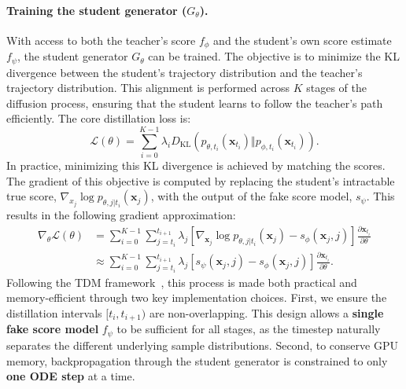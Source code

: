 \documentclass[letterpaper]{article} %
\begin{document}
\paragraph{Training the student generator ($G_{\theta}$).}
With access to both the teacher's score $f_{\phi}$ and the student's own score estimate $f_{\psi}$, the student generator $G_{\theta}$ can be trained. The objective is to minimize the KL divergence between the student's trajectory distribution and the teacher's trajectory distribution. This alignment is performed across $K$ stages of the diffusion process, ensuring that the student learns to follow the teacher's path efficiently. The core distillation loss is:
\begin{equation}
\label{eq:distillation_loss}
\mathcal{L}(\theta) = \sum_{i=0}^{K-1} \lambda_i D_{\text{KL}}\left( p_{\theta, t_i}(\mathbf{x}_{t_i}) \Vert p_{\phi, t_i}(\mathbf{x}_{t_i}) \right).
\end{equation}
In practice, minimizing this KL divergence is achieved by matching the scores. The gradient of this objective is computed by replacing the student's intractable true score, $\nabla_{x_j} \log p_{\theta, j|t_i}(\mathbf{x}_{j})$, with the output of the fake score model, $s_{\psi}$. This results in the following gradient approximation:
\begin{align}
\label{eq:distillation_gradient}
\nabla_{\theta} \mathcal{L}(\theta) &= \sum_{i=0}^{K-1} \sum_{j=t_i}^{t_{i+1}} \lambda_{j} [\nabla_{\mathbf{x}_j} \log p_{\theta, j|t_i}(\mathbf{x}_{j}) - s_{\phi}(\mathbf{x}_{j}, j)] \frac{\partial \mathbf{x}_{t_i}}{\partial \theta} \\
&\approx \sum_{i=0}^{K-1} \sum_{j=t_i}^{t_{i+1}} \lambda_{j} [s_{\psi}(\mathbf{x}_{j}, j) - s_{\phi}(\mathbf{x}_{j}, j)] \frac{\partial \mathbf{x}_{t_i}}{\partial \theta}. \nonumber
\end{align}
Following the TDM framework~\cite{luo2025tdm}, this process is made both practical and memory-efficient through two key implementation choices. First, we ensure the distillation intervals $[t_i, t_{i+1})$ are non-overlapping. This design allows a \textbf{single fake score model} $f_{\psi}$ to be sufficient for all stages, as the timestep naturally separates the different underlying sample distributions. Second, to conserve GPU memory, backpropagation through the student generator is constrained to only \textbf{one ODE step} at a time.
\end{document}
